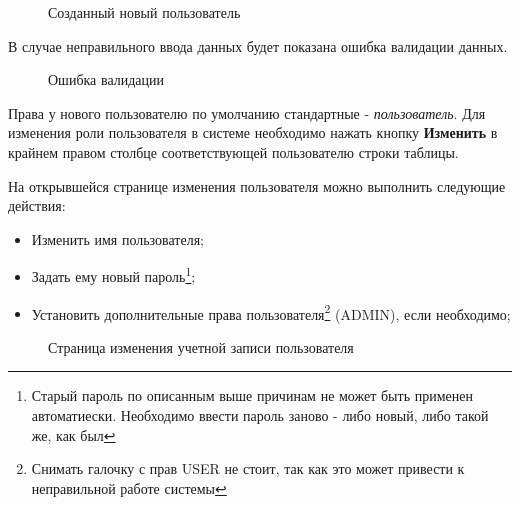\documentclass[a4paper]{article}
\begin{document}
\begin{figure}[h]
\caption{Созданный новый пользователь}
\label{fig:image10}
\end{figure}

В случае неправильного ввода данных будет показана ошибка валидации данных.

\begin{figure}[h]
\caption{Ошибка валидации}
\label{fig:image11}
\end{figure}

Права у нового пользователю по умолчанию стандартные - \textit{пользователь}. Для изменения роли пользователя в системе необходимо нажать кнопку \textbf{Изменить} в крайнем правом столбце соответствующей пользователю строки таблицы.

На открывшейся странице изменения пользователя можно выполнить следующие действия:

\begin{itemize}
\setlength{\itemsep}{-2mm}
	\item Изменить имя пользователя;
	\item Задать ему новый пароль\footnote{Старый пароль по описанным выше причинам не может быть применен автоматиески. Необходимо ввести пароль заново - либо новый, либо такой же, как был};
	\item Установить дополнительные права пользователя\footnote{Снимать галочку с прав USER не стоит, так как это может привести к неправильной работе системы} (ADMIN), если необходимо;
\end{itemize}

\begin{figure}[h]
\caption{Страница изменения учетной записи пользователя}
\label{fig:image12}
\end{figure}
\end{document}
